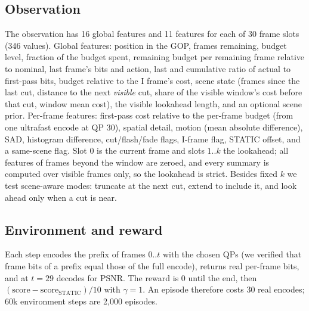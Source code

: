 \documentclass[conference]{IEEEtran}
\begin{document}
\subsection{Observation}
The observation has 16 global features and 11 features for each of 30 frame slots (346 values). Global features: position in the GOP, frames remaining, budget level, fraction of the budget spent, remaining budget per remaining frame relative to nominal, last frame's bits and action, last and cumulative ratio of actual to first-pass bits, budget relative to the I frame's cost, scene state (frames since the last cut, distance to the next \emph{visible} cut, share of the visible window's cost before that cut, window mean cost), the visible lookahead length, and an optional scene prior. Per-frame features: first-pass cost relative to the per-frame budget (from one ultrafast encode at QP 30), spatial detail, motion (mean absolute difference), SAD, histogram difference, cut/flash/fade flags, I-frame flag, STATIC offset, and a same-scene flag. Slot 0 is the current frame and slots $1..k$ the lookahead; all features of frames beyond the window are zeroed, and every summary is computed over visible frames only, so the lookahead is strict. Besides fixed $k$ we test scene-aware modes: truncate at the next cut, extend to include it, and look ahead only when a cut is near.

\subsection{Environment and reward}
Each step encodes the prefix of frames $0..t$ with the chosen QPs (we verified that frame bits of a prefix equal those of the full encode), returns real per-frame bits, and at $t{=}29$ decodes for PSNR. The reward is 0 until the end, then $(\text{score} - \text{score}_{\text{STATIC}})/10$ with $\gamma{=}1$. An episode therefore costs 30 real encodes; 60k environment steps are 2{,}000 episodes.
\end{document}
